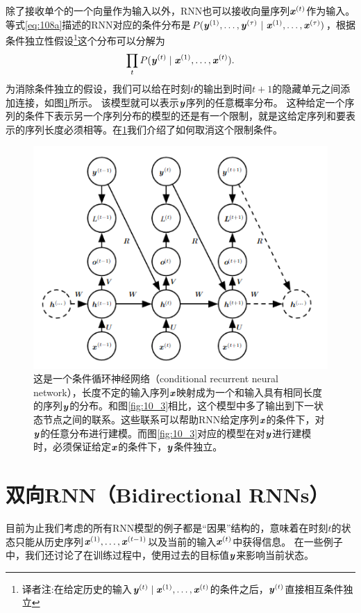 除了接收单个的一个向量作为输入以外，RNN也可以接收向量序列$\boldsymbol{\mathit{x}}^{(t)}$作为输入。等式\ref{eq:108a}描述的RNN对应的条件分布是$P(\boldsymbol{\mathit{y}}^{(1)}, \dots, \boldsymbol{\mathit{y}}^{(\tau)} ~|~ \boldsymbol{\mathit{x}}^{(1)}, \dots, \boldsymbol{\mathit{x}}^{(\tau)})$，根据条件独立性假设\footnote{译者注:在给定历史的输入$\boldsymbol{\mathit{y}}^{(t)} \mid \boldsymbol{\mathit{x}}^{(1)}, \dots, \boldsymbol{\mathit{x}}^{(t)}$的条件之后，$\boldsymbol{\mathit{y}}^{(t)}$直接相互条件独立}这个分布可以分解为
\begin{align}
 \prod_t P(\boldsymbol{\mathit{y}}^{(t)} \mid \boldsymbol{\mathit{x}}^{(1)}, \dots, \boldsymbol{\mathit{x}}^{(t)}).
\end{align}
为消除条件独立的假设，我们可以给在时刻$t$的输出到时间$t+1$的隐藏单元之间添加连接，如图\ref{fig:10_10}所示。
该模型就可以表示$\boldsymbol{\mathit{y}}$序列的任意概率分布。
这种给定一个序列的条件下表示另一个序列分布的模型的还是有一个限制，就是这给定序列和要表示的序列长度必须相等。在\ref{sec:10.4}我们介绍了如何取消这个限制条件。
\begin{figure}[htbp] %
   \centering
   \includegraphics[width=6in]{fig/chap10/10_10.PNG} 
   \caption{ 这是一个条件循环神经网络（conditional recurrent neural network），长度不定的输入序列$\boldsymbol{\mathit{x}}$映射成为一个和输入具有相同长度的序列$\boldsymbol{\mathit{y}}$的分布。和图\ref{fig:10_3}相比，这个模型中多了输出到下一状态节点之间的联系。这些联系可以帮助RNN给定序列$\boldsymbol{\mathit{x}}$的条件下，对$\boldsymbol{\mathit{y}}$的任意分布进行建模。而图\ref{fig:10_3}对应的模型在对$\boldsymbol{\mathit{y}}$进行建模时，必须保证给定$\boldsymbol{\mathit{x}}$的条件下，$\boldsymbol{\mathit{y}}$条件独立。}
   \label{fig:10_10}
\end{figure}
\section{双向RNN（Bidirectional RNNs）}
\label{sec:10.4}
目前为止我们考虑的所有RNN模型的例子都是“因果”结构的，意味着在时刻$t$的状态只能从历史序列$\boldsymbol{\mathit{x}}^{(1)},\dots,\boldsymbol{\mathit{x}}^{(t-1)}$以及当前的输入$\boldsymbol{\mathit{x}}^{(t)}$中获得信息。
在一些例子中，我们还讨论了在训练过程中，使用过去的目标值$\boldsymbol{\mathit{y}}$来影响当前状态。

